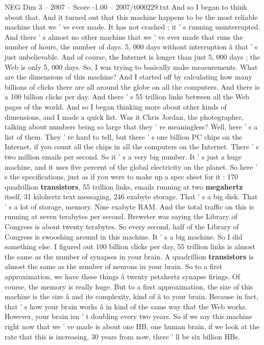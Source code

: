 \begin{textsample}{NEG Dim 3 – 2007 – Score -1.00 – 2007/t000229.txt}
And so I began to think about that.
And it turned out that this machine happens to be the most reliable machine that we ' ve ever made.
It has not crashed ; it ' s running uninterrupted.
And there ' s almost no other machine that we ' ve ever made that runs the number of hours, the number of days. 5, 000 days without interruption â that ' s just unbelievable.
And of course, the Internet is longer than just 5, 000 days ; the Web is only 5, 000 days.
So, I was trying to basically make measurements.
What are the dimensions of this machine?
And I started off by calculating how many billions of clicks there are all around the globe on all the computers.
And there is a 100 billion clicks per day.
And there ' s 55 trillion links between all the Web pages of the world.
And so I began thinking more about other kinds of dimensions, and I made a quick list.
Was it Chris Jordan, the photographer, talking about numbers being so large that they ' re meaningless?
Well, here ' s a list of them.
They ' re hard to tell, but there ' s one billion PC chips on the Internet, if you count all the chips in all the computers on the Internet.
There ' s two million emails per second.
So it ' s a very big number.
It ' s just a huge machine, and it uses five percent of the global electricity on the planet.
So here ' s the specifications, just as if you were to make up a spec sheet for it : 170 quadrillion \textbf{transistors}, 55 trillion links, emails running at two \textbf{megahertz} itself, 31 kilohertz text messaging, 246 exabyte storage.
That ' s a big disk.
That ' s a lot of storage, memory.
Nine exabyte RAM.
And the total traffic on this is running at seven terabytes per second.
Brewster was saying the Library of Congress is about twenty terabytes.
So every second, half of the Library of Congress is swooshing around in this machine.
It ' s a big machine.
So I did something else.
I figured out 100 billion clicks per day, 55 trillion links is almost the same as the number of synapses in your brain.
A quadrillion \textbf{transistors} is almost the same as the number of neurons in your brain.
So to a first approximation, we have these things â twenty petahertz synapse firings.
Of course, the memory is really huge.
But to a first approximation, the size of this machine is the size â and its complexity, kind of â to your brain.
Because in fact, that ' s how your brain works â in kind of the same way that the Web works.
However, your brain isn ' t doubling every two years.
So if we say this machine right now that we ' ve made is about one HB, one human brain, if we look at the rate that this is increasing, 30 years from now, there ' ll be six billion HBs.

\end{textsample}
